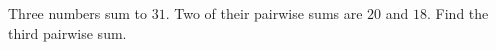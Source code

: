 Three numbers sum to $31$. Two of their pairwise sums are $20$ and $18$. Find the third pairwise sum.

